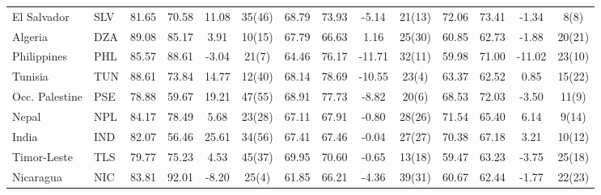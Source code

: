 \begin{longtable}{m{2.4cm}lcccc|cccc|cccc}
El Salvador                       & SLV           & 81.65            & 70.58              & 11.08            & 35(46)           & 68.79    & 73.93      & -5.14    & 21(13)   & 72.06           & 73.41             & -1.34           & 8(8)            \\
Algeria                           & DZA           & 89.08            & 85.17              & 3.91             & 10(15)           & 67.79    & 66.63      & 1.16     & 25(30)   & 60.85           & 62.73             & -1.88           & 20(21)          \\
Philippines                       & PHL           & 85.57            & 88.61              & -3.04            & 21(7)            & 64.46    & 76.17      & -11.71   & 32(11)   & 59.98           & 71.00             & -11.02          & 23(10)          \\
Tunisia                           & TUN           & 88.61            & 73.84              & 14.77            & 12(40)           & 68.14    & 78.69      & -10.55   & 23(4)    & 63.37           & 62.52             & 0.85            & 15(22)          \\
Occ. Palestine    & PSE           & 78.88            & 59.67              & 19.21            & 47(55)           & 68.91    & 77.73      & -8.82    & 20(6)    & 68.53           & 72.03             & -3.50           & 11(9)           \\
Nepal                             & NPL           & 84.17            & 78.49              & 5.68             & 23(28)           & 67.11    & 67.91      & -0.80    & 28(26)   & 71.54           & 65.40             & 6.14            & 9(14)           \\
India                             & IND           & 82.07            & 56.46              & 25.61            & 34(56)           & 67.41    & 67.46      & -0.04    & 27(27)   & 70.38           & 67.18             & 3.21            & 10(12)          \\
Timor-Leste                       & TLS           & 79.77            & 75.23              & 4.53             & 45(37)           & 69.95    & 70.60      & -0.65    & 13(18)   & 59.47           & 63.23             & -3.75           & 25(18)          \\
Nicaragua                         & NIC           & 83.81            & 92.01              & -8.20            & 25(4)            & 61.85    & 66.21      & -4.36    & 39(31)   & 60.67           & 62.44             & -1.77           & 22(23)          \\

\end{longtable}
